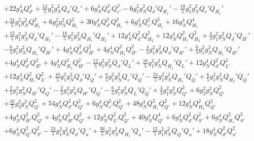 {\begin{align}
 &+22 g_{N}^{4} Q_{d'}^{4} +\frac{12}{5} g_{1}^{2} g_{N}^{2} Q_d' Q_e' +6 g_{N}^{4} Q_{d'}^{2} Q_{e'}^{2} -6 g_{1}^{2} g_{N}^{2} Q_d' Q_{H_1}' -\frac{18}{5} g_{1}^{2} g_{N}^{2} Q_e' Q_{H_1}' \nonumber \\ 
 &+\frac{24}{5} g_{1}^{2} g_{N}^{2} Q_{H_1}^{2} +6 g_{2}^{2} g_{N}^{2} Q_{H_1}^{2} +30 g_{N}^{4} Q_{d'}^{2} Q_{H_1}^{2} +6 g_{N}^{4} Q_{e'}^{2} Q_{H_1}^{2} +16 g_{N}^{4} Q_{H_1}^{4} \nonumber \\ 
 &+\frac{12}{5} g_{1}^{2} g_{N}^{2} Q_d' Q_{H_2}' -\frac{18}{5} g_{1}^{2} g_{N}^{2} Q_{H_1}' Q_{H_2}' +12 g_{N}^{4} Q_{d'}^{2} Q_{H_2}^{2} +12 g_{N}^{4} Q_{H_1}^{2} Q_{H_2}^{2} +\frac{4}{5} g_{1}^{2} g_{N}^{2} Q_d' Q_{\bar{H}'}' \nonumber \\ 
 &-\frac{6}{5} g_{1}^{2} g_{N}^{2} Q_{H_1}' Q_{\bar{H}'}' +4 g_{N}^{4} Q_{d'}^{2} Q_{\bar{H}'}^{2} +4 g_{N}^{4} Q_{H_1}^{2} Q_{\bar{H}'}^{2} -\frac{4}{5} g_{1}^{2} g_{N}^{2} Q_d' Q_{H'}' +\frac{6}{5} g_{1}^{2} g_{N}^{2} Q_{H_1}' Q_{H'}' \nonumber \\ 
 &+4 g_{N}^{4} Q_{d'}^{2} Q_{H'}^{2} +4 g_{N}^{4} Q_{H_1}^{2} Q_{H'}^{2} -\frac{12}{5} g_{1}^{2} g_{N}^{2} Q_d' Q_L' +\frac{18}{5} g_{1}^{2} g_{N}^{2} Q_{H_1}' Q_L' +12 g_{N}^{4} Q_{d'}^{2} Q_{L'}^{2} \nonumber \\ 
 &+12 g_{N}^{4} Q_{H_1}^{2} Q_{L'}^{2} +\frac{18}{5} g_{1}^{2} g_{N}^{2} Q_d' Q_Q' +\frac{6}{5} g_{1}^{2} g_{N}^{2} Q_e' Q_Q' -\frac{24}{5} g_{1}^{2} g_{N}^{2} Q_{H_1}' Q_Q' +\frac{6}{5} g_{1}^{2} g_{N}^{2} Q_{H_2}' Q_Q' \nonumber \\ 
 &+\frac{2}{5} g_{1}^{2} g_{N}^{2} Q_{\bar{H}'}' Q_Q' -\frac{2}{5} g_{1}^{2} g_{N}^{2} Q_{H'}' Q_Q' -\frac{6}{5} g_{1}^{2} g_{N}^{2} Q_L' Q_Q' +\frac{4}{3} g_{1}^{2} g_{N}^{2} Q_{Q'}^{2} +6 g_{2}^{2} g_{N}^{2} Q_{Q'}^{2} \nonumber \\ 
 &+\frac{32}{3} g_{3}^{2} g_{N}^{2} Q_{Q'}^{2} +54 g_{N}^{4} Q_{d'}^{2} Q_{Q'}^{2} +6 g_{N}^{4} Q_{e'}^{2} Q_{Q'}^{2} +48 g_{N}^{4} Q_{H_1}^{2} Q_{Q'}^{2} +12 g_{N}^{4} Q_{H_2}^{2} Q_{Q'}^{2} \nonumber \\ 
 &+4 g_{N}^{4} Q_{\bar{H}'}^{2} Q_{Q'}^{2} +4 g_{N}^{4} Q_{H'}^{2} Q_{Q'}^{2} +12 g_{N}^{4} Q_{L'}^{2} Q_{Q'}^{2} +40 g_{N}^{4} Q_{Q'}^{4} +6 g_{N}^{4} Q_{d'}^{2} Q_{S'}^{2} +6 g_{N}^{4} Q_{H_1}^{2} Q_{S'}^{2} \nonumber \\ 
 &+6 g_{N}^{4} Q_{Q'}^{2} Q_{S'}^{2} -\frac{24}{5} g_{1}^{2} g_{N}^{2} Q_d' Q_u' +\frac{36}{5} g_{1}^{2} g_{N}^{2} Q_{H_1}' Q_u' -\frac{12}{5} g_{1}^{2} g_{N}^{2} Q_Q' Q_u' +18 g_{N}^{4} Q_{d'}^{2} Q_{u'}^{2} \nonumber \\ 

\end{align}}
